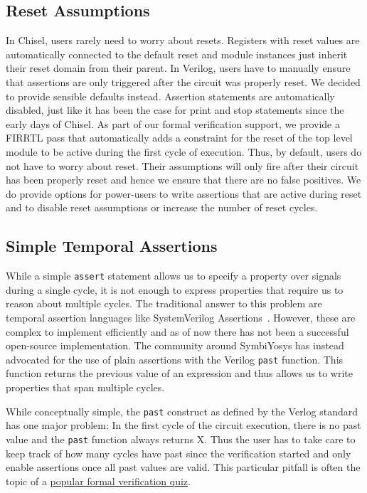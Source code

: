 \documentclass[conference]{IEEEtran}
\newcommand\scalainline[1]{\texttt{#1}}
\begin{document}
\subsection{Reset Assumptions}\label{sec:reset}

In Chisel, users rarely need to worry about resets.
Registers with reset values are automatically connected to the default reset %
and module instances just inherit their reset domain from their parent.
In Verilog, users have to manually ensure that assertions are only triggered after the circuit was properly reset.
We decided to provide sensible defaults instead.
Assertion statements are automatically disabled, just like it has been the case for print and stop statements
since the early days of Chisel.
As part of our formal verification support, we provide a FIRRTL pass
that automatically adds a constraint for the reset of the top level module to be active during the first cycle of execution.
Thus, by default, users do not have to worry about reset. Their assumptions will only fire
after their circuit has been properly reset and hence we ensure that there are no false positives.
We do provide options for power-users to write assertions that are active during reset and to
disable reset assumptions or increase the number of reset cycles.


\subsection{Simple Temporal Assertions}\label{sec:past}


While a simple \scalainline{assert} statement allows us to specify a property over signals during a single
cycle, it is not enough to express properties that require us to reason about multiple cycles.
The traditional answer to this problem are temporal assertion languages like SystemVerilog Assertions~\cite{SystemVerilog}.
However, these are complex to implement efficiently and as of now there has not been a successful open-source implementation.
The community around SymbiYosys has instead advocated for the use of plain assertions with the Verilog \scalainline{past}
function. This function returns the previous value of an expression and thus allows us to write properties that span multiple cycles.

While conceptually simple, the \scalainline{past} construct as defined by the Verlog standard has one major problem:
In the first cycle of the circuit execution, there is no past value and the \scalainline{past} function always returns X.
Thus the user has to take care to keep track of how many cycles have past since the verification started and only enable assertions
once all past values are valid.
This particular pitfall is often the topic of a \href{http://zipcpu.com/quiz/2019/11/16/quiz07.html}{popular formal verification quiz}.
\end{document}
